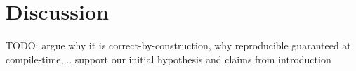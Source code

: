 \section{Discussion}
TODO: argue why it is correct-by-construction, why reproducible guaranteed at compile-time,... support our initial hypothesis and claims from introduction